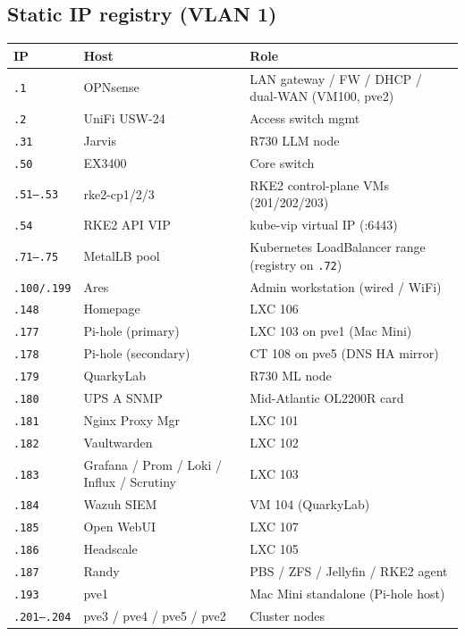\documentclass[11pt,letterpaper]{article}
\newcommand{\ip}[1]{\texttt{#1}}
\begin{document}
\subsection{Static IP registry (VLAN 1)}
\begin{center}\footnotesize
\begin{longtable}{@{}l l p{9.3cm}@{}}
\toprule IP & Host & Role \\ \midrule \endhead
\ip{.1} & OPNsense & LAN gateway / FW / DHCP / dual-WAN (VM100, pve2) \\
\ip{.2} & UniFi USW-24 & Access switch mgmt \\
\ip{.31} & Jarvis & R730 LLM node \\
\ip{.50} & EX3400 & Core switch \\
\ip{.51--.53} & rke2-cp1/2/3 & RKE2 control-plane VMs (201/202/203) \\
\ip{.54} & RKE2 API VIP & kube-vip virtual IP (:6443) \\
\ip{.71--.75} & MetalLB pool & Kubernetes LoadBalancer range (registry on \ip{.72}) \\
\ip{.100/.199} & Ares & Admin workstation (wired / WiFi) \\
\ip{.148} & Homepage & LXC 106 \\
\ip{.177} & Pi-hole (primary) & LXC 103 on pve1 (Mac Mini) \\
\ip{.178} & Pi-hole (secondary) & CT 108 on pve5 (DNS HA mirror) \\
\ip{.179} & QuarkyLab & R730 ML node \\
\ip{.180} & UPS A SNMP & Mid-Atlantic OL2200R card \\
\ip{.181} & Nginx Proxy Mgr & LXC 101 \\
\ip{.182} & Vaultwarden & LXC 102 \\
\ip{.183} & Grafana / Prom / Loki / Influx / Scrutiny & LXC 103 \\
\ip{.184} & Wazuh SIEM & VM 104 (QuarkyLab) \\
\ip{.185} & Open WebUI & LXC 107 \\
\ip{.186} & Headscale & LXC 105 \\
\ip{.187} & Randy & PBS / ZFS / Jellyfin / RKE2 agent \\
\ip{.193} & pve1 & Mac Mini standalone (Pi-hole host) \\
\ip{.201--.204} & pve3 / pve4 / pve5 / pve2 & Cluster nodes \\
\bottomrule
\end{longtable}
\end{center}
\end{document}
